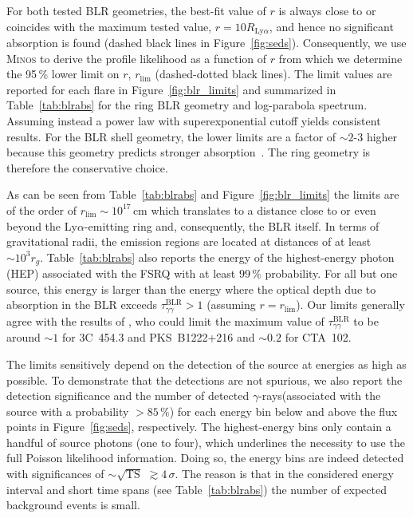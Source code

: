 \documentclass[twocolumn]{aastex62}
\newcommand{\Grays}{$\gamma$-rays\xspace}
\begin{document}
For both tested BLR geometries, the best-fit value of $r$ is always close to or coincides with the maximum tested value, $r = 10R_{\mathrm{Ly}\alpha}$, and hence no significant absorption is found (dashed black lines in Figure~\ref{fig:seds}). Consequently,  we use \textsc{Minos} to derive the profile likelihood as a function of $r$ from which we determine the 95\,\% lower limit on $r$, $r_\mathrm{lim}$ (dashed-dotted black lines). 
The limit values are reported for each flare in Figure~\ref{fig:blr_limits} and  summarized in Table~\ref{tab:blrabs} for the ring BLR geometry and log-parabola spectrum.
Assuming instead a power law with superexponential cutoff yields consistent results. 
For the BLR shell geometry, the lower limits are a factor of $\sim2$-$3$ higher because this geometry predicts stronger absorption~\citep{finke2016}. The ring geometry is therefore the conservative choice. 

As can be seen from Table~\ref{tab:blrabs} and Figure~\ref{fig:blr_limits} the limits are of the order of $r_\mathrm{lim}\sim10^{17}\,$cm which translates to a distance close to or even beyond the Ly$\alpha$-emitting ring and, consequently, the BLR itself. In terms of gravitational radii, the emission regions are located at distances of at least $\sim10^3r_g$. 
Table~\ref{tab:blrabs} also reports the energy of the highest-energy photon (HEP) associated with the FSRQ with at least $99\,\%$ probability. For all but one source, this energy is larger than the energy where the optical depth due to absorption in the BLR exceeds $\tau_{\gamma\gamma}^\mathrm{BLR} > 1$ (assuming $r = r_\mathrm{lim}$).
Our limits generally agree with the results of \citet{2018MNRAS.477.4749C}, who could limit the maximum value of $\tau_{\gamma\gamma}^\mathrm{BLR}$ to be around $\sim 1$ for 3C~454.3 and PKS~B1222+216 and $\sim 0.2$ for CTA~102. 

The limits sensitively depend on the detection of the source at energies as high as possible. To demonstrate that the detections are not spurious, we also report the detection significance and the number of detected \Grays (associated with the source with a probability $>85\,\%$) for each energy bin below and above the flux points in Figure~\ref{fig:seds}, respectively. The highest-energy bins only contain a handful of source photons (one to four), which underlines the necessity to use the full Poisson likelihood information. 
Doing so, the energy bins are indeed detected with significances of $\sim \sqrt{\mathrm{TS}}$ $\gtrsim 4\,\sigma$.
The reason is that in the considered energy interval and short time spans (see  Table~\ref{tab:blrabs}) the number of expected background events is small. 
\end{document}
